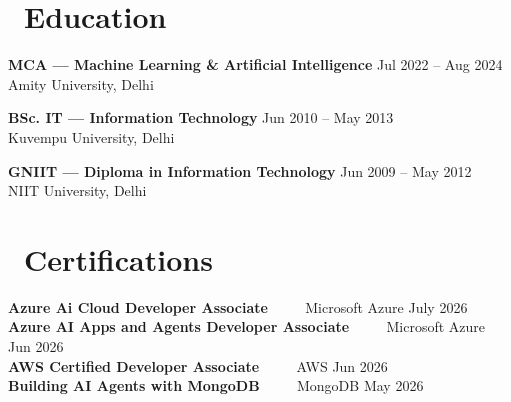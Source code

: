 \documentclass[10pt, letterpaper]{article}
\newcommand{\educrow}[3]{%
  \noindent
  {\fontsize{10}{12}\bfseries\color{textmain}#1}
  \hfill
  {\fontsize{9.5}{11}\color{textmuted}#3}\\
  {\fontsize{9.5}{11}\color{textmuted}#2}
  \vspace{4pt}
}
\newcommand{\certrow}[3]{%
  \noindent
  {\fontsize{9.5}{11}\bfseries\color{textmain}#1}
  {\color{textmuted}\ \ \textbar\ \ }
  {\color{textmuted}#2}
  \hfill
  {\fontsize{9}{11}\color{textmuted}#3}\\[7pt]
}
\begin{document}
\vspace{3pt}
\section{\faGraduationCap\ Education}
\educrow{MCA --- Machine Learning \& Artificial Intelligence}{Amity University, Delhi}{Jul 2022 -- Aug 2024}

\educrow{BSc. IT --- Information Technology}{Kuvempu University, Delhi}{Jun 2010 -- May 2013}

\educrow{GNIIT --- Diploma in Information Technology}{NIIT University, Delhi}{Jun 2009 -- May 2012}

\vspace{3pt}
\section{\faCertificate\ Certifications}

\certrow{Azure Ai Cloud Developer Associate}{Microsoft Azure}{July 2026}
\certrow{Azure AI Apps and Agents Developer Associate}{Microsoft Azure}{Jun 2026}
\certrow{AWS Certified Developer Associate}{AWS}{Jun 2026}
\certrow{Building AI Agents with MongoDB}{MongoDB}{May 2026}
\end{document}
